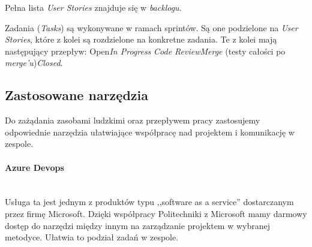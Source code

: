 \documentclass[10pt, titlepage, oneside, a4paper]{article}
\begin{document}
	Pełna lista \textit{User Stories} znajduje się w \textit{backlogu}.

	Zadania (\textit{Tasks}) są wykonywane w ramach sprintów. Są one podzielone na \textit{User Stories}, które z kolei są rozdzielone na konkretne zadania. Te z kolei mają następujący przepływ: Open\textrightarrow \textit{In Progress} \textrightarrow \textit{Code Review}\textrightarrow \textit{Merge} (testy całości po \textit{merge'u})\textrightarrow \textit{Closed}.
	
	\subsection{Zastosowane narzędzia}
	Do zażądania zasobami ludzkimi oraz przepływem pracy zastosujemy odpowiednie narzędzia ułatwiające współpracę nad projektem i komunikację w zespole.

	\paragraph{Azure Devops} \mbox{} \\
	Usługa ta jest jednym z produktów typu ,,software as a service'' dostarczanym przez firmę Microsoft.
	Dzięki współpracy Politechniki z Microsoft mamy darmowy dostęp do narzędzi między innym na zarządzanie projektem w wybranej metodyce. Ułatwia to podział zadań w zespole.

 
\end{document}
